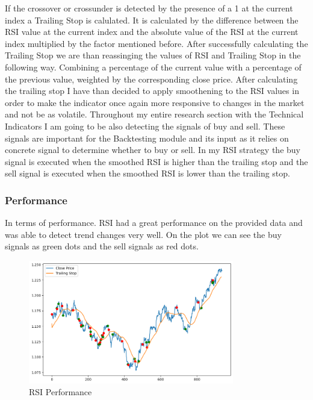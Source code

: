 \documentclass{imc-inf}
\begin{document}
			If the crossover or crossunder is detected by the presence of a 1 at the current index a Trailing Stop is calulated. It is calculated by
			the difference between the RSI value at the current index and the absolute value of the RSI at the current index multiplied by the factor mentioned before.
			After successfully calculating the Trailing Stop we are than reassinging the values of RSI and Trailing Stop in the following way. Combining a 
			percentage of the current value with a percentage of the previous value, weighted by the corresponding close price.
			After calculating the trailing stop I have than decided to apply smoothening to the RSI values in order to make the indicator once again
			more responsive to changes in the market and not be as volatile.
			Throughout my entire research section with the Technical Indicators I am going to be also detecting the signals of buy and sell.
			These signals are important for the Backtesting module and its input as it relies on concrete signal to determine whether to buy or sell.
			In my RSI strategy the buy signal is executed when the smoothed RSI is higher than the trailing stop and the sell signal is executed when the
			smoothed RSI is lower than the trailing stop. 
			\subsubsection{Performance}
				
				In terms of performance. RSI had a great performance on the provided data and was able to detect trend changes very well. On the plot we can
				see the buy signals as green dots and the sell signals as red dots.
				\begin{figure}[h!]
					\centering
					\includegraphics[width=0.8\textwidth]{rsi_plot.png}
					\caption{RSI Performance}
					\label{fig:rsi_performance}	
				\end{figure}
\end{document}
